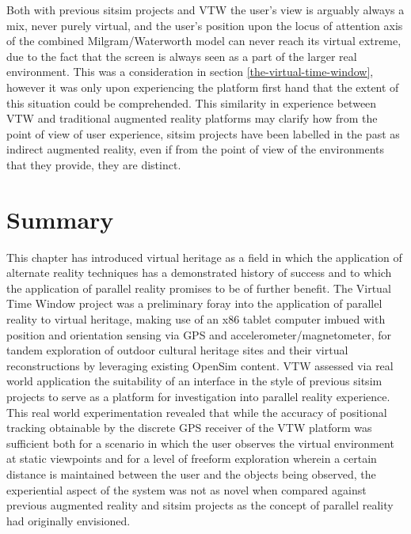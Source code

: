 Both with previous sitsim projects and VTW the user's view is arguably always a mix, never purely virtual, and the user's position upon the locus of attention axis of the combined Milgram/Waterworth model can never reach its virtual extreme, due to the fact that the screen is always seen as a part of the larger real environment. This was a consideration in section \ref{the-virtual-time-window}, however it was only upon experiencing the platform first hand that the extent of this situation could be comprehended. This similarity in experience between VTW and traditional augmented reality platforms may clarify how from the point of view of user experience, sitsim projects have been labelled in the past as indirect augmented reality, even if from the point of view of the environments that they provide, they are distinct.


\section{Summary}

This chapter has introduced virtual heritage as a field in which the application of alternate reality techniques has a demonstrated history of success and to which the application of parallel reality promises to be of further benefit. The Virtual Time Window project was a preliminary foray into the application of parallel reality to virtual heritage, making use of an x86 tablet computer imbued with position and orientation sensing via GPS and accelerometer/magnetometer, for tandem exploration of outdoor cultural heritage sites and their virtual reconstructions by leveraging existing OpenSim content. VTW assessed via real world application the suitability of an interface in the style of previous sitsim projects to serve as a platform for investigation into parallel reality experience. This real world experimentation revealed that while the accuracy of positional tracking obtainable by the discrete GPS receiver of the VTW platform was sufficient both for a scenario in which the user observes the virtual environment at static viewpoints and for a level of freeform exploration wherein a certain distance is maintained between the user and the objects being observed, the experiential aspect of the system was not as novel when compared against previous augmented reality and sitsim projects as the concept of parallel reality had originally envisioned.

